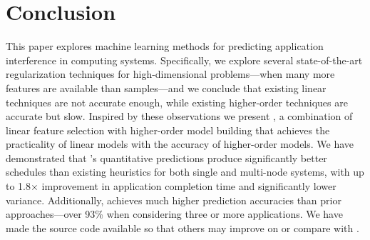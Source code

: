 \section{Conclusion}
This paper explores machine learning methods for predicting
application interference in computing systems.  Specifically, we
explore several state-of-the-art regularization techniques for
high-dimensional problems---when many more features are available than
samples---and we conclude that existing linear techniques are not
accurate enough, while existing higher-order techniques are accurate
but slow.  Inspired by these observations we present \SYSTEMESP{}, a
combination of linear feature selection with higher-order model
building that achieves the practicality of linear models with the
accuracy of higher-order models.  We have demonstrated that
\SYSTEMESP{}'s quantitative predictions produce significantly better
schedules than existing heuristics for both single and multi-node
systems, with up to 1.8$\times$ improvement in application completion
time and significantly lower variance.  Additionally, \SYSTEMESP{}
achieves much higher prediction accuracies than prior
approaches---over 93\% when considering three or more applications.
We have made the source code available so that others may improve on
or compare with \SYSTEMESP{}.
